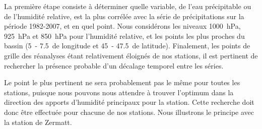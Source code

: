 \documentclass[hess]{copernicus}
\begin{document}
La première étape consiste à déterminer quelle variable, de l'eau précipitable ou de l'humidité relative, est la plus corrélée avec la série de précipitations sur la période 1982-2007, et en quel point. Nous considérons les niveaux 1000~hPa, 925~hPa et 850~hPa pour l'humidité relative, et les points les plus proches du bassin (5\textdegree\ - 7.5\textdegree\ de longitude et 45\textdegree\ - 47.5\textdegree\ de latitude). Finalement, les points de grille des réanalyses étant relativement éloignés de nos stations, il est pertinent de rechercher la présence probable d'un décalage temporel entre les séries. 

Le point le plus pertinent ne sera probablement pas le même pour toutes les stations, puisque nous pouvons nous attendre à trouver l'optimum dans la direction des apports d'humidité principaux pour la station. Cette recherche doit donc être effectuée pour chacune de nos stations. Nous illustrons le principe avec la station de Zermatt.
\end{document}
